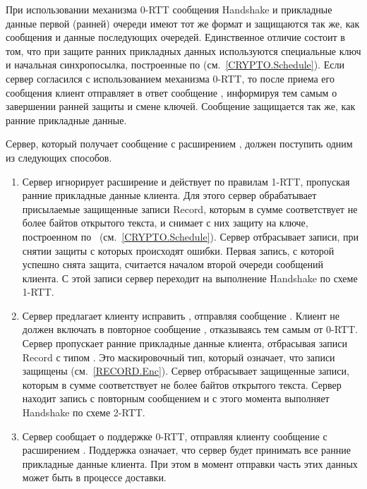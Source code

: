При использовании механизма 0-RTT сообщения Handshake и прикладные данные 
первой (ранней) очереди имеют тот же формат и защищаются так же, как сообщения 
и данные последующих очередей.
%
Единственное отличие состоит в том, что при защите ранних прикладных данных 
используются специальные ключ и начальная синхропосылка, построенные
по  (см.~\ref{CRYPTO.Schedule}).
%
Если сервер согласился с использованием механизма 0-RTT, то после приема его 
сообщения  клиент отправляет в ответ сообщение
, информируя тем самым о завершении ранней 
защиты и смене ключей. Сообщение  защищается так 
же, как ранние прикладные данные.

Сервер, который получает сообщение  с расширением 
, должен поступить одним из следующих способов.

\begin{enumerate}
\item
Сервер игнорирует расширение  и действует по правилам 1-RTT,
пропуская ранние прикладные данные клиента.
%
Для этого сервер обрабатывает присылаемые защищенные записи Record, которым в 
сумме соответствует не более  байтов открытого текста, 
и снимает с них защиту на ключе, построенном
по~ (см.~\ref{CRYPTO.Schedule}).
%
Сервер отбрасывает записи, при снятии защиты с которых происходят ошибки. Первая 
запись, с которой успешно снята защита, считается началом второй очереди 
сообщений клиента.
%
С этой записи сервер переходит на выполнение Handshake по схеме 1-RTT.

\item
Сервер предлагает клиенту исправить , отправляя
сообщение .
%
Клиент не должен включать  в повторное сообщение 
, отказываясь тем самым от 0-RTT.
%
Сервер пропускает ранние прикладные данные клиента, отбрасывая записи Record с типом 
. Это маскировочный тип, который означает, что записи защищены 
(см.~\ref{RECORD.Enc}). Сервер отбрасывает защищенные записи, которым в сумме 
соответствует не более  байтов открытого текста.
%
Сервер находит запись с повторным сообщением  и с 
этого момента выполняет Handshake по схеме 2-RTT.

\item
Сервер сообщает о поддержке 0-RTT, отправляя клиенту сообщение 
 с расширением .
%
Поддержка означает, что сервер будет принимать все ранние прикладные данные 
клиента. При этом в момент отправки  часть 
этих данных может быть в процессе доставки.
\end{enumerate}

